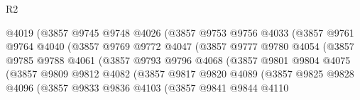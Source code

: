 \begin{lexlean}{R2}
\begin{coremodule}
                              @4019
                              (@3857
                                @9745
                                @9748
                                @4026
                                (@3857
                                  @9753
                                  @9756
                                  @4033
                                  (@3857
                                    @9761
                                    @9764
                                    @4040
                                    (@3857
                                      @9769
                                      @9772
                                      @4047
                                      (@3857
                                        @9777
                                        @9780
                                        @4054
                                        (@3857
                                          @9785
                                          @9788
                                          @4061
                                          (@3857
                                            @9793
                                            @9796
                                            @4068
                                            (@3857
                                              @9801
                                              @9804
                                              @4075
                                              (@3857
                                                @9809
                                                @9812
                                                @4082
                                                (@3857
                                                  @9817
                                                  @9820
                                                  @4089
                                                  (@3857
                                                    @9825
                                                    @9828
                                                    @4096
                                                    (@3857
                                                      @9833
                                                      @9836
                                                      @4103
                                                      (@3857
                                                        @9841
                                                        @9844
                                                        @4110

\end{coremodule}
\end{lexlean}

